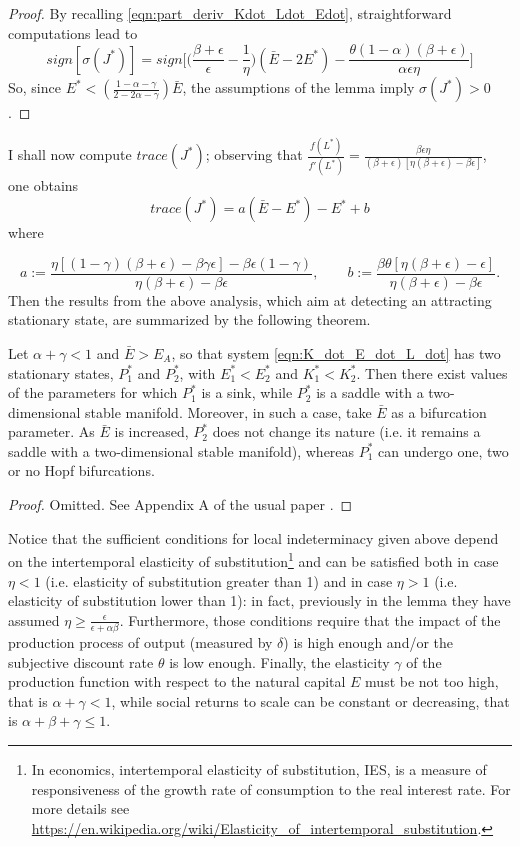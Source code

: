 \begin{proof}
	By recalling \eqref{eqn:part_deriv_Kdot_Ldot_Edot}, straightforward computations lead to 
	$$ sign[\sigma(J^*)] = sign\Bigg[\Bigg(\frac{\beta+\epsilon}{\epsilon}-\frac{1}{\eta}\Bigg)(\bar{E}-2E^*)-\frac{\theta(1-\alpha)(\beta+\epsilon)}{\alpha\epsilon\eta}\Bigg] $$
	So, since $E^*<(\frac{1-\alpha-\gamma}{2-2\alpha-\gamma})\bar{E}$, the assumptions of the lemma imply $\sigma(J^*)>0$.
\end{proof}
I shall now compute $trace(J^*)$; observing that $\frac{f(L^*)}{f'(L^*)}=\frac{\beta\epsilon\eta}{(\beta+\epsilon)[\eta(\beta+\epsilon)-\beta\epsilon]}$, one obtains $$trace(J^*)=a(\bar{E}-E^*)-E^*+b$$ where 

\begin{equation} \label{eqn:a_b_def}
	a:=\frac{\eta[(1-\gamma)(\beta+\epsilon)-\beta\gamma\epsilon]-\beta\epsilon(1-\gamma)}{\eta(\beta+\epsilon)-\beta\epsilon}, \qquad b:=\frac{\beta\theta[\eta(\beta+\epsilon)-\epsilon]}{\eta(\beta+\epsilon)-\beta\epsilon}.
\end{equation}
Then the results from the above analysis, which aim at detecting an attracting stationary state, are summarized by the following theorem.
\begin{thm} \label{thm:result_of_analysis}
	Let $\alpha+\gamma<1$ and $\bar{E}>E_A$, so that system \eqref{eqn:K_dot_E_dot_L_dot} has two stationary states, $P_1^*$ and $P_2^*$, with $E_1^*<E_2^*$ and $K_1^*<K_2^*$. Then there exist values of the parameters for which $P_1^*$ is a sink, while $P_2^*$ is a saddle with a two-dimensional stable manifold. Moreover, in such a case, take $\bar{E}$ as a bifurcation parameter. As $\bar{E}$ is increased, $P_2^*$ does not change its nature (i.e. it remains a saddle with a two-dimensional stable manifold), whereas $P_1^*$ can undergo one, two or no Hopf bifurcations.
\end{thm}
\begin{proof}
	Omitted. See Appendix A of the usual paper \cite{antoci_poverty_2011}.
\end{proof}
Notice that the sufficient conditions for local indeterminacy given above depend on the intertemporal elasticity of substitution\footnote{In economics, intertemporal elasticity of substitution, IES, is a measure of responsiveness of the growth rate of consumption to the real interest rate. For more details see \url{https://en.wikipedia.org/wiki/Elasticity_of_intertemporal_substitution}.} 
and can be satisfied both in case $\eta<1$ (i.e. elasticity of substitution greater than 1) and in case $\eta>1$ (i.e. elasticity of substitution lower than 1): in fact, previously in the lemma they have assumed $\eta\geq \frac{\epsilon}{\epsilon+\alpha\beta}$. Furthermore, those conditions require that the impact of the production process of output (measured by $\delta$) is high enough and/or the subjective discount rate $\theta$ is low enough. Finally, the elasticity $\gamma$ of the production function with respect to the natural capital $E$ must be not too high, that is $\alpha+\gamma<1$, while social returns to scale can be constant or decreasing, that is $\alpha+\beta+\gamma\leq1$.

